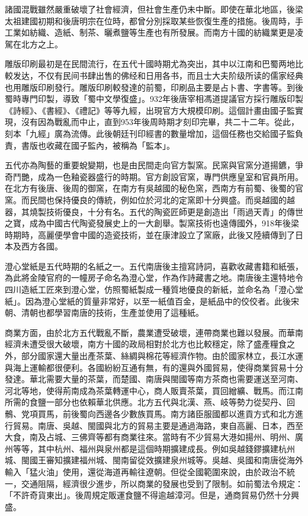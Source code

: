 諸國混戰雖然嚴重破壞了社會經濟，但社會生產仍未中斷。即使在華北地區，後梁太祖建國初期和後唐明宗在位時，都曾分別採取某些恢復生產的措施。後周時，手工業如紡織、造紙、制茶、曬煮鹽等生產也有所發展。而南方十國的紡織業更是凌駕在北方之上。

雕版印刷最初是在民間流行，在五代十國時期尤為突出，其中以江南和巴蜀两地比較发达，不仅有民间书肆出售的佛经和日用各书，而且士大夫阶级所读的儒家经典也用雕版印刷發行。雕版印刷較發達的前蜀，印刷品主要是占卜書、字書等。到後蜀時專門印製，導致「蜀中文學復盛」。932年後唐宰相馮道提議官方採行雕版印製《詩經》、《書經》、《禮記》等等九經，出現官方大規模印刷。這個計畫由國子監實現，沒有因為戰亂而中止，直到953年後周時期才刻印完畢，共二十二年。從此，刻本「九經」廣為流傳。此後朝廷刊印經書的數量增加，這個任務也交給國子監負責，書版也收藏在國子監內，被稱為「監本」。

五代亦為陶藝的重要蛻變期，也是由民間走向官方製窯。民窯與官窯分道揚鑣，爭奇鬥艷，成為一色釉瓷器盛行的時期。官方創設官窯，專門供應皇室和官員所用。在北方有後唐、後周的御窯，在南方有吳越國的秘色窯，西南方有前蜀、後蜀的官窯。而民間也保持優良的傳統，例如位於河北的定窯即十分興盛。而吳越國的越器，其燒製技術優良，十分有名。五代的陶瓷匠師更是創造出「雨過天青」的傳世之寶，成為中國古代陶瓷發展史上的一大創舉。製窯技術也遠傳國外，918年後梁時期時，高麗便學會中國的造瓷技術，並在康津設立了窯廠，此後又陸續傳到了日本及西方各國。

澄心堂紙是五代時期的名紙之一。五代南唐後主擅寫詩詞，喜歡收藏書籍和紙張，為此將金陵官府的一幢房子命名為澄心堂，作為作詩藏書之地。南唐後主還特地令四川造紙工匠來到澄心堂，仿照蜀紙製成一種質地優良的新紙，並命名為「澄心堂紙」。因為澄心堂紙的質量非常好，以至一紙值百金，是紙品中的佼佼者。此後宋朝、清朝也都學習南唐的技術，生產並使用了這種紙。

商業方面，由於北方五代戰亂不斷，農業遭受破壞，連帶商業也難以發展。而華南經濟未遭受很大破壞，南方十國的政局相對於北方也比較穩定，除了盛產糧食之外，部分國家還大量出產茶葉、絲綢與棉花等經濟作物。由於國家林立，長江水運與海上運輸都很便利。各國紛紛互通有無，有的還與外國貿易，使得商業貿易十分發達。華北需要大量的茶葉，而楚國、南唐與閩國等南方茶商也需要運送至河南、河北等地，使得荊南成為茶葉轉運中心，商人販賣茶葉，買回繒纊、戰馬。而江南所需的食鹽一部分也依賴華北供應。北方五代與北漢、燕、岐等勢力從契丹、回鶻、党項買馬，前後蜀向西邊各少數族買馬。南方諸臣服國都以進貢方式和北方進行貿易。南唐、吳越、閩國與北方的貿易主要是通過海路，東自高麗、日本，西至大食，南及占城、三佛齊等都有商業往來。當時有不少貿易大港如揚州、明州、廣州等等，其中杭州、福州與泉州都是這個時期擴建成長。例如吳越錢鏐擴建杭州城、閩國王審知擴建福州城、閩南留從效擴建泉州城等。吳越、吳國和南唐從海外輸入「猛火油」使用，還從海道再輸往遼朝。但從全國範圍來說，由於政治不統一，交通阻隔，經濟很少進步，所以商業的發展也受到了限制。如前蜀法令規定：「不許奇貨東出」。後周規定販運食鹽不得逾越漳河。但是，通商貿易仍然十分興盛。

